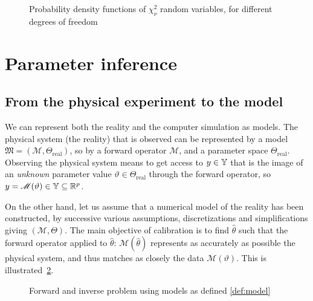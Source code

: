 \documentclass[../../Main_ManuscritThese.tex]{subfiles}
\newcommand\imgpath{/home/victor/acadwriting/Manuscrit/Text/Chapter2/img/}
\begin{document}
\begin{figure}[ht]
  \centering
  
  \caption{Probability density functions of $\chi^2_{\nu}$ random variables, for different degrees of freedom}
  \label{fig:chi2_examples}
\end{figure}





\section{Parameter inference}
\label{sec:parameter_inference}
\subsection{From the physical experiment to the model}
\label{ssec:inv_problem}
We can represent both the reality and the computer simulation as models.
The physical system (the reality) that is observed can be represented by a model $\mathfrak{M}=\left(\mathscr{M},\Theta_{\mathrm{real}}\right)$, so by a forward operator $\mathscr{M}$, and a parameter space $\Theta_{\mathrm{real}}$.
Observing the physical system means to get access to $y\in \mathbb{Y}$ that is the image of an \emph{unknown} parameter value $\vartheta \in \Theta_{\mathrm{real}}$ through the forward operator, so $y = \mathscr{M}(\vartheta)\in \mathbb{Y} \subseteq \mathbb{R}^p$.

On the other hand, let us assume that a numerical model of the reality has been constructed, by successive various assumptions, discretizations and simplifications giving $(\mathcal{M},\Theta)$. The main objective of calibration is to find $\hat{\theta}$ such that the forward operator applied to $\hat{\theta}$: $\mathcal{M}(\hat{\theta})$ represents as accurately as possible the physical system, and thus matches as closely the data $\mathscr{M}(\vartheta)$. This is illustrated~\cref{fig:inv_problem}.

\begin{figure}[ht]
  \centering
  
  \caption{Forward and inverse problem using models as defined \cref{def:model}}
  \label{fig:inv_problem}
\end{figure}

% 
\end{document}
